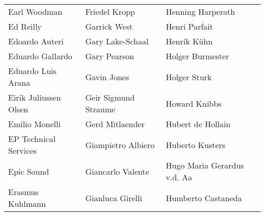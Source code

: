\begin{tabular}{p{4.5cm}p{4.5cm}p{4.5cm}}
Earl Woodman & Friedel Kropp & Henning Harperath \\
Ed Reilly & Garrick West & Henri Parfait \\
Edoardo Auteri & Gary Lake-Schaal & Henrik Kühn \\
Eduardo Gallardo & Gary Pearson & Holger Burmester \\
Eduardo Luis Arana & Gavin Jones & Holger Sturk \\
Eirik Juliussen Olsen & Geir Sigmund Straume & Howard Knibbs \\
Emilio Monelli & Gerd Mitlaender & Hubert de Hollain \\
EP Technical Services & Giampietro Albiero & Huberto Kusters \\
Epic Sound & Giancarlo Valente & Hugo Maria Gerardus v.d. Aa \\
Erasmus Kuhlmann & Gianluca Girelli & Humberto Castaneda \\
\end{tabular}
\newpage
\setlength{\tabcolsep}{1mm}
